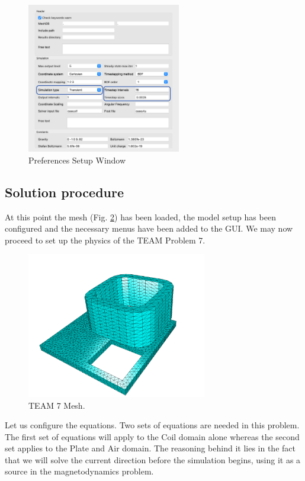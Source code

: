 \begin{figure}[H]
\centering
\includegraphics[width=0.6\textwidth]{figures/transient_setup.png}
\caption{Preferences Setup Window}\label{fg:time_setup}
\end{figure}  

\subsection*{Solution procedure}

At this point the mesh (Fig. \ref{fg:mesh}) has been loaded,  the model setup has been configured and the necessary menus have been added to the GUI.  We may now proceed to set up the physics of the TEAM Problem 7. 

\begin{figure}[H]
\centering
\includegraphics[width=0.7\textwidth]{figures/TEAM7_mesh.png}
\caption{TEAM 7 Mesh.}\label{fg:mesh}
\end{figure}



Let us configure the equations. Two sets of equations are needed in this problem. The first set of equations will apply to the Coil domain alone whereas the second set applies to the Plate and Air domain.  The reasoning behind it lies in the fact that we will solve the current direction before the simulation begins,  using it as a source in the magnetodynamics problem.

